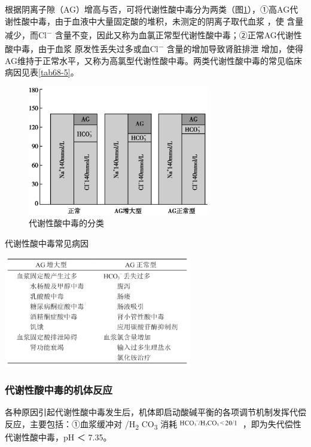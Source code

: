 根据阴离子隙（AG）增高与否，可将代谢性酸中毒分为两类（图\ref{fig68-3}），①高AG代谢性酸中毒，由于血液中大量固定酸的堆积，未测定的阴离子取代血浆{}
，使{} 含量减少，而Cl\textsuperscript{−}
含量不变，因此又称为血氯正常型代谢性酸中毒；②正常AG代谢性酸中毒，由于血浆{}
原发性丢失过多或血Cl\textsuperscript{−} 含量的增加导致肾脏排泄{}
增加，使得AG维持于正常水平，又称为高氯型代谢性酸中毒。两类代谢性酸中毒的常见临床病因见表\ref{tab68-5}。

\begin{figure}[!htbp]
 \centering
 \includegraphics[width=3.11458in,height=2.22917in]{./images/Image00285.jpg}
 \captionsetup{justification=centering}
 \caption{代谢性酸中毒的分类}
 \label{fig68-3}
  \end{figure} 

\begin{table}[htbp]
\centering
\caption{代谢性酸中毒常见病因}
\label{tab68-5}
\includegraphics[width=3.22917in,height=1.89583in]{./images/Image00286.jpg}
\end{table}

\subsubsection{代谢性酸中毒的机体反应}

各种原因引起代谢性酸中毒发生后，机体即启动酸碱平衡的各项调节机制发挥代偿反应，主要包括：①血浆缓冲对{}
/H\textsubscript{2} CO\textsubscript{3}
消耗\includegraphics[width=1.09375in,height=0.14583in]{./images/Image00288.jpg}
，即为失代偿性代谢性酸中毒，pH ＜ 7.35。

